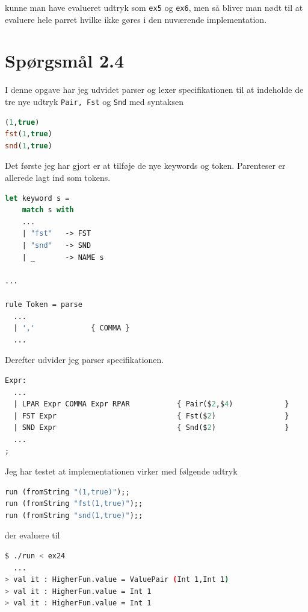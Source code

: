 \documentclass[danish,a4paper]{report}
\begin{document}
kunne man have evalueret udtryk som \texttt{ex5} og \texttt{ex6}, men så bliver man nødt til at evaluere hele parret hvilke ikke gøres i den nuværende implementation.

\section*{Spørgsmål 2.4}

I denne opgave har jeg udvidet parser og lexer specifikationen til at indeholde de tre nye udtryk \texttt{Pair, Fst} og \texttt{Snd} med syntaksen

\begin{lstlisting}[language=ML]
(1,true)
fst(1,true)
snd(1,true)
\end{lstlisting}

Det første jeg har gjort er at tilføje de nye keywords og token. Parenteser er allerede lagt ind som tokens. 

\begin{lstlisting}[language=ML]
let keyword s =
    match s with
    ...
    | "fst"   -> FST
    | "snd"   -> SND
    | _       -> NAME s 

...

rule Token = parse
  ...
  | ','             { COMMA }
  ...
\end{lstlisting}

Derefter udvider jeg parser specifikationen.

\begin{lstlisting}[language=ML]
Expr:
  ...
  | LPAR Expr COMMA Expr RPAR           { Pair($2,$4)            }
  | FST Expr                            { Fst($2)                }
  | SND Expr                            { Snd($2)                }
  ...
;
\end{lstlisting}

Jeg har testet at implementationen virker med følgende udtryk

\begin{lstlisting}[language=ML]
run (fromString "(1,true)");;
run (fromString "fst(1,true)");;
run (fromString "snd(1,true)");;
\end{lstlisting}

der evaluere til

\begin{lstlisting}[language=bash]
$ ./run < ex24
  ...
> val it : HigherFun.value = ValuePair (Int 1,Int 1)
> val it : HigherFun.value = Int 1
> val it : HigherFun.value = Int 1
\end{lstlisting}
\end{document}
